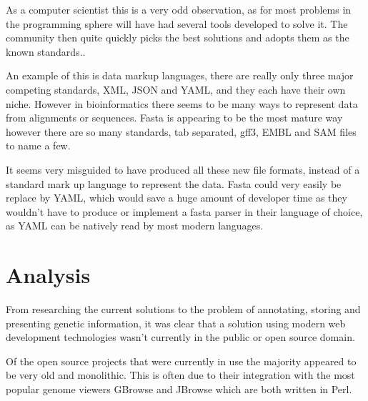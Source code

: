 As a computer scientist this is a very odd observation, as for most problems in the programming sphere will have had several tools developed to solve it. The community then quite quickly picks the best solutions and adopts them as the known standards.\cite{needed}. 

An example of this is data markup languages, there are really only three major competing standards, XML, JSON and YAML, and they each have their own niche. However in bioinformatics there seems to be many ways to represent data from alignments or sequences. Fasta is appearing to be the most mature way however there are so many standards, tab separated, gff3, EMBL and SAM files to name a few. 

It seems very misguided to have produced all these new file formats, instead of a standard mark up language to represent the data. Fasta could very easily be replace by YAML, which would save a huge amount of developer time as they wouldn't have to produce or implement a fasta parser in their language of choice, as YAML can be natively read by most modern languages. 

%

\section{Analysis}

From researching the current solutions to the problem of annotating, storing and presenting genetic information, it was clear that a solution using modern web development technologies wasn't currently in the public or open source domain. 

Of the open source projects that were currently in use the majority appeared to be very old and monolithic. This is often due to their integration with the most popular genome viewers GBrowse\cite{gbrowse} and JBrowse\cite{jbrowse} which are both written in Perl.

